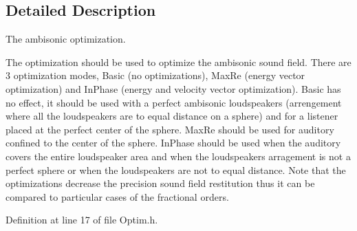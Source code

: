 \subsection{Detailed Description}
The ambisonic optimization. 

The optimization should be used to optimize the ambisonic sound field. There are 3 optimization modes, Basic (no optimizations), Max\-Re (energy vector optimization) and In\-Phase (energy and velocity vector optimization). Basic has no effect, it should be used with a perfect ambisonic loudspeakers (arrengement where all the loudspeakers are to equal distance on a sphere) and for a listener placed at the perfect center of the sphere. Max\-Re should be used for auditory confined to the center of the sphere. In\-Phase should be used when the auditory covers the entire loudspeaker area and when the loudspeakers arragement is not a perfect sphere or when the loudspeakers are not to equal distance. Note that the optimizations decrease the precision sound field restitution thus it can be compared to particular cases of the fractional orders. 

Definition at line 17 of file Optim.\-h.



